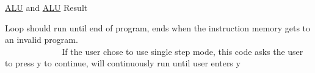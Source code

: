 \mbox{\hyperlink{class_a_l_u}{A\+LU}} and \mbox{\hyperlink{class_a_l_u}{A\+LU}} Result

Loop should run until end of program, ends when the instruction memory gets to an invalid program. ~\newline
~\newline
~\newline
~\newline
~\newline
~\newline
~\newline
~\newline
~\newline
~\newline
~\newline
~\newline
~\newline
~\newline
~\newline
~\newline
~\newline
~\newline
~\newline
~\newline
~\newline
~\newline
~\newline
~\newline
~\newline
~\newline
~\newline
~\newline
~\newline
~\newline
~\newline
~\newline
~\newline
~\newline
~\newline
~\newline
~\newline
~\newline
~\newline
~\newline
 If the user chose to use single step mode, this code asks the user to press y to continue, will continuously run until user enters y ~\newline
~\newline
~\newline
~\newline
~\newline
